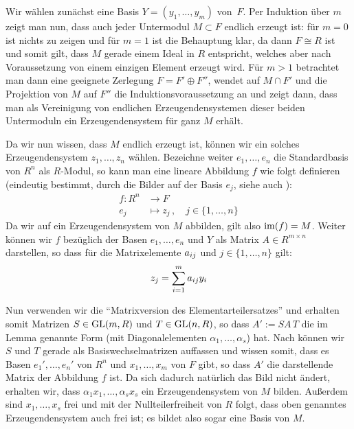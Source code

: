 \begin{proofsketch}
    Wir wählen zunächst eine Basis $Y = (y_1,\ldots,y_m)$ von~$F$. Per Induktion
    über $m$ zeigt man nun, dass auch jeder Untermodul $M\subset F$ endlich
    erzeugt ist: für $m=0$ ist nichts zu zeigen und für $m=1$ ist die Behauptung
    klar, da dann $F\cong R$ ist und somit gilt, dass $M$ gerade einem Ideal in
    $R$ entspricht, welches aber nach Voraussetzung von einem einzigen Element erzeugt
    wird. Für $m>1$ betrachtet man dann eine geeignete Zerlegung $F = F'
    \oplus F''$, wendet auf $M\cap F'$ und die Projektion von $M$ auf $F''$ die
    Induktionsvoraussetzung an und zeigt dann, dass man als Vereinigung von
    endlichen Erzeugendensystemen dieser beiden Untermoduln ein
    Erzeugendensystem für ganz $M$ erhält.
    
    Da wir nun wissen, dass $M$ endlich erzeugt ist, können wir ein solches
    Erzeugendensystem $z_1,\ldots,z_n$ wählen. Bezeichne weiter $e_1,\ldots,e_n$
    die Standardbasis von $R^n$ als $R$-Modul, so kann man eine lineare
    Abbildung $f$ wie folgt definieren (eindeutig bestimmt, durch die Bilder auf
    der Basis $e_j$, siehe auch \cite[1.1\,ff.]{talk:rei}):
    \begin{align*}
        f\colon R^n &\to F  \\
        e_j &\mapsto z_j \,, \quad j\in\{1,\ldots,n\}
    \end{align*}
    Da wir auf ein Erzeugendensystem von $M$ abbilden, gilt also
    $\operatorname{im}(f) = M$. Weiter können wir $f$ bezüglich der Basen $e_1,\ldots,e_n$
    und $Y$ als Matrix $A\in R^{m\times n}$ darstellen, so dass für die
    Matrixelemente $a_{ij}$ und $j\in\{1,\ldots,n\}$ gilt:
    \[ z_j = \sum_{i=1}^m a_{ij} y_i \]
    
    Nun verwenden wir die \enquote{Matrixversion des Elementarteilersatzes}
    und erhalten somit Matrizen $S\in\mathrm{GL}(m,R)$ und $T\in\mathrm{GL}(n,R)$, so
    dass $A' := SA\,T$ die im Lemma genannte Form (mit Diagonalelementen
    $\alpha_1,\ldots,\alpha_s$) hat. Nach \cite[1.11]{talk:ruemp}
    können wir $S$ und $T$ gerade als Basiswechselmatrizen auffassen und
    wissen somit, dass es Basen $e_1',\ldots,e_n'$ von $R^n$ und
    $x_1,\ldots,x_m$ von $F$ gibt, so dass $A'$ die darstellende Matrix der
    Abbildung $f$ ist. Da sich dadurch natürlich das Bild nicht ändert, erhalten
    wir, dass $\alpha_1 x_1, \ldots, \alpha_s x_s$ ein Erzeugendensystem von $M$
    bilden. Außerdem sind $x_1,\ldots,x_s$ frei und mit der Nullteilerfreiheit
    von $R$ folgt, dass oben genanntes Erzeugendensystem auch frei ist; es
    bildet also sogar eine Basis von $M$.
    \\
\end{proofsketch}

